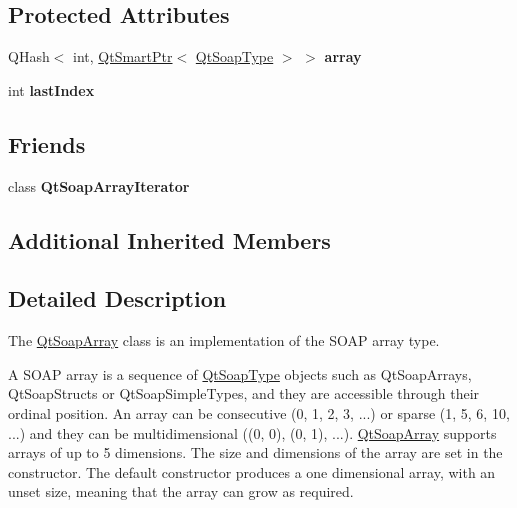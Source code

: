 \subsection*{Protected Attributes}
\begin{DoxyCompactItemize}
\item 
\mbox{\label{class_qt_soap_array_a5f3acf55e7baf5f7fae34b3367253c5e}} 
Q\+Hash$<$ int, \mbox{\hyperlink{class_qt_smart_ptr}{Qt\+Smart\+Ptr}}$<$ \mbox{\hyperlink{class_qt_soap_type}{Qt\+Soap\+Type}} $>$ $>$ {\bfseries array}
\item 
\mbox{\label{class_qt_soap_array_a97e73ee56b0b5b660fd7149f50096bc0}} 
int {\bfseries last\+Index}
\end{DoxyCompactItemize}
\subsection*{Friends}
\begin{DoxyCompactItemize}
\item 
\mbox{\label{class_qt_soap_array_a18f700eabe733026d85a331b6357c662}} 
class {\bfseries Qt\+Soap\+Array\+Iterator}
\end{DoxyCompactItemize}
\subsection*{Additional Inherited Members}


\subsection{Detailed Description}
The \mbox{\hyperlink{class_qt_soap_array}{Qt\+Soap\+Array}} class is an implementation of the S\+O\+AP array type. 

A S\+O\+AP array is a sequence of \mbox{\hyperlink{class_qt_soap_type}{Qt\+Soap\+Type}} objects such as Qt\+Soap\+Arrays, Qt\+Soap\+Structs or Qt\+Soap\+Simple\+Types, and they are accessible through their ordinal position. An array can be consecutive (0, 1, 2, 3, ...) or sparse (1, 5, 6, 10, ...) and they can be multidimensional ((0, 0), (0, 1), ...). \mbox{\hyperlink{class_qt_soap_array}{Qt\+Soap\+Array}} supports arrays of up to 5 dimensions. The size and dimensions of the array are set in the constructor. The default constructor produces a one dimensional array, with an unset size, meaning that the array can grow as required.


